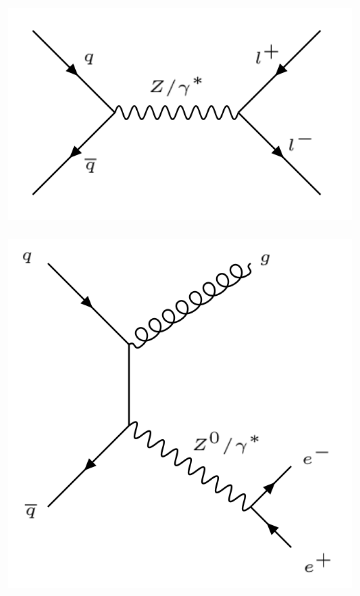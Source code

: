 \documentclass{article}
\begin{document}
\begin{figure}[h]
    \centering
    \begin{subfigure}{.25\textwidth}
        \includegraphics[scale = 0.2]{images/DY.png}
        \caption{}
        \label{fig:bckgFeynman_DY}
    \end{subfigure}
    \begin{subfigure}{.25\textwidth}
        \includegraphics[height=\textwidth]{images/DY_bck.png}
        \caption{}
        \label{fig:bckgFeynman_DY_bck}
    \end{subfigure}    	
    \begin{subfigure}{.25\textwidth}

\end{subfigure}
\end{figure}
\end{document}
